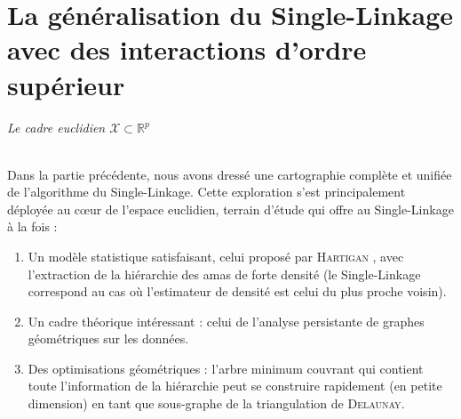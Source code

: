 \documentclass{these-ISSS} %
\begin{document}








\part{La généralisation du Single-Linkage avec des interactions d'ordre supérieur} %


\paragraph{Le cadre euclidien $\mathcal X \subset \mathbb R^p$}
Dans la partie précédente, nous avons dressé une cartographie complète et unifiée de l'algorithme du Single-Linkage.
Cette exploration s'est principalement déployée au cœur de l'espace euclidien, terrain d'étude qui offre au Single-Linkage à la fois :
\begin{enumerate}
    \item Un modèle statistique satisfaisant, celui proposé par \textsc{Hartigan} \cite{hartigan81}, avec l'extraction de la hiérarchie des amas de forte densité (le Single-Linkage correspond au cas où l'estimateur de densité est celui du plus proche voisin).
    \item Un cadre théorique intéressant : celui de l'analyse persistante de graphes géométriques sur les données.
    \item Des optimisations géométriques : l'arbre minimum couvrant qui contient toute l'information de la hiérarchie peut se construire rapidement (en petite dimension) en tant que sous-graphe de la triangulation de \textsc{Delaunay}.
\end{enumerate}
\end{document}

